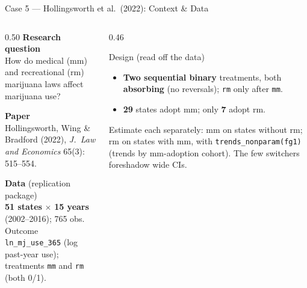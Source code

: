 \documentclass[main.tex]{subfiles}
\begin{document}
\begin{frame}{Case 5 --- Hollingsworth et al.\ (2022): Context \& Data}

  \begin{columns}[T]
    \begin{column}{0.50\textwidth}
      \textbf{Research question}\\
      How do medical (mm) and recreational (rm) marijuana laws affect
      marijuana use?

      \medskip
      \textbf{Paper}\\
      Hollingsworth, Wing \& Bradford (2022),
      \textit{J.\ Law and Economics} 65(3): 515--554.

      \medskip
      \textbf{Data} (replication package)\\
      \textbf{51 states} $\times$ \textbf{15 years} (2002--2016); 765 obs.\\[3pt]
      Outcome \texttt{ln\_mj\_use\_365} (log past-year use); treatments
      \texttt{mm} and \texttt{rm} (both 0/1).
    \end{column}
    \begin{column}{0.46\textwidth}
      \begin{block}{Design (read off the data)}
        \footnotesize
        \begin{itemize}\footnotesize
          \item \textbf{Two sequential binary} treatments, both
            \textbf{absorbing} (no reversals); \texttt{rm} only after
            \texttt{mm}.
          \item \textbf{29} states adopt mm; only \textbf{7} adopt rm.
        \end{itemize}
      \end{block}

      \smallskip
      \footnotesize Estimate each separately: mm on states without rm; rm
      on states with mm, with \texttt{trends\_nonparam(fg1)} (trends by
      mm-adoption cohort). The few switchers foreshadow wide CIs.
    \end{column}
  \end{columns}

\end{frame}
\end{document}
